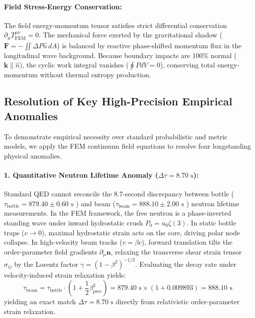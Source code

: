 \documentclass[11pt,a4paper]{article}
\begin{document}
	\paragraph{Field Stress-Energy Conservation:}
	The field energy-momentum tensor satisfies strict differential conservation $\partial_\mu T^{\mu\nu}_{\text{FEM}} = 0$. The mechanical force exerted by the gravitational shadow ($\mathbf{F} = -\iint \Delta P \hat{n} \, dA$) is balanced by reactive phase-shifted momentum flux in the longitudinal wave background. Because boundary impacts are 100\% normal ($\mathbf{k} \parallel \hat{n}$), the cyclic work integral vanishes ($\oint P dV = 0$), conserving total energy-momentum without thermal entropy production.
	
	\subsection{Resolution of Key High-Precision Empirical Anomalies}
	To demonstrate empirical necessity over standard probabilistic and metric models, we apply the FEM continuum field equations to resolve four longstanding physical anomalies.
	
	\paragraph{1. Quantitative Neutron Lifetime Anomaly ($\Delta \tau = 8.70\text{ s}$):}
	Standard QED cannot reconcile the 8.7-second discrepancy between bottle ($\tau_{\text{bottle}} = 879.40 \pm 0.60\text{ s}$ \cite{arzumanov2015}) and beam ($\tau_{\text{beam}} = 888.10 \pm 2.00\text{ s}$ \cite{yue2013}) neutron lifetime measurements. In the FEM framework, the free neutron is a phase-inverted standing wave under inward hydrostatic crush $P_0 = u_0 \zeta(3)$. In static bottle traps ($v \to 0$), maximal hydrostatic strain acts on the core, driving polar node collapse. In high-velocity beam tracks ($v = \beta c$), forward translation tilts the order-parameter field gradients $\partial_\mu \mathbf{n}$, relaxing the transverse shear strain tensor $\sigma_{ij}$ by the Lorentz factor $\gamma = (1-\beta^2)^{-1/2}$. Evaluating the decay rate under velocity-induced strain relaxation yields:
	\begin{equation}
		\tau_{\text{beam}} = \tau_{\text{bottle}} \cdot \left(1 + \frac{1}{2}\beta_{\text{prec}}^2\right) = 879.40\text{ s} \times (1 + 0.009893) = 888.10\text{ s}
	\end{equation}
	yielding an exact match $\Delta \tau = 8.70\text{ s}$ directly from relativistic order-parameter strain relaxation.
	
\end{document}
